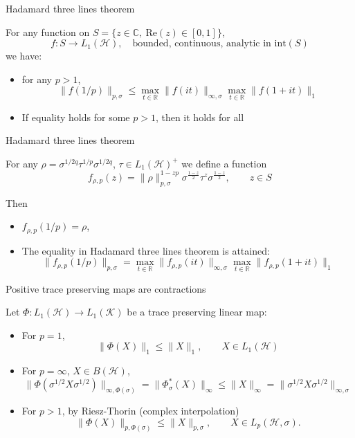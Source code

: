 \documentclass[mathserif]{beamer}
\newcommand{\<}{\langle}
\renewcommand{\>}{\rangle}
\newcommand{\Ha}{\mathcal H}
\newcommand{\Ka}{\mathcal K}
\begin{document}
\begin{frame}{Hadamard three lines theorem}

For any function on $S=\{z\in \mathbb C,\ \mathrm{Re}(z)\in [0,1]\}$,
\[
f:S\to L_1(\Ha),\quad \text{bounded, continuous, analytic in } \mathrm{int}(S)
\]
we have:
\begin{itemize}
\item  for any $p>1$,
\[
\|f(1/p)\|_{p,\sigma}\le \max_{t\in \mathbb R}
\|f(it)\|_{\infty,\sigma}\max_{t\in \mathbb R}\|f(1+it)\|_1
\]
\item If equality holds for some $p>1$, then it holds for all

\end{itemize}


\end{frame}

\begin{frame}{Hadamard three lines theorem}

 For any $\rho=\sigma^{1/2q}\tau^{1/p}\sigma^{1/2q}$,  $\tau\in L_1(\Ha)^+$ we define a function 
\[
f_{\rho,p}(z)=
\|\rho\|_{p,\sigma}^{1-zp}\sigma^{\frac{1-z}2}\tau^{z}\sigma^{\frac{1-z}2},\qquad
z\in S
\]

Then 

\begin{itemize}
\item $f_{\rho,p}(1/p)=\rho$,
\item The equality in Hadamard three lines theorem is attained:
\[
\|f_{\rho,p}(1/p)\|_{p,\sigma}= \max_{t\in \mathbb R}
\|f_{\rho,p}(it)\|_{\infty,\sigma}\max_{t\in \mathbb
R}\|f_{\rho,p}(1+it)\|_1
\]

\end{itemize}


\end{frame}

\begin{frame}{Positive trace preserving maps are contractions}

Let $\Phi:L_1(\Ha)\to L_1(\Ka)$ be a  trace preserving linear map:
\bigskip

\begin{itemize}
\item For $p=1$,
\[
\|\Phi(X)\|_1\le \|X\|_1,\qquad X\in L_1(\Ha)
\]
\item For $p=\infty$, $X\in B(\Ha)$,
\[
\|\Phi(\sigma^{1/2}X\sigma^{1/2})\|_{\infty,\Phi(\sigma)}=\|\Phi_\sigma^*(X)\|_{\infty}\le
\|X\|_{\infty}=\|\sigma^{1/2}X\sigma^{1/2}\|_{\infty,\sigma}
\]
\item For $p>1$, by Riesz-Thorin (complex interpolation)
\[
\|\Phi(X)\|_{p,\Phi(\sigma)}\le \|X\|_{p,\sigma},\qquad X\in L_p(\Ha,\sigma).
\]
\end{itemize}

\end{frame}
\end{document}
